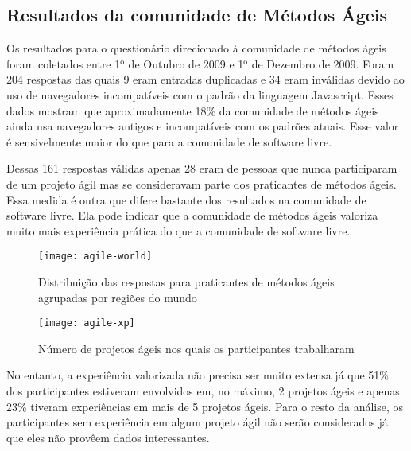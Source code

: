 \subsection{Resultados da comunidade de Métodos Ágeis}
\label{sec:resp-agile}

Os resultados para o questionário direcionado à comunidade de métodos
ágeis foram coletados entre 1$^{\textrm{o}}$ de Outubro de 2009 e
1$^{\textrm{o}}$ de Dezembro de 2009. Foram 204 respostas das quais 9
eram entradas duplicadas e 34 eram inválidas devido ao uso de
navegadores incompatíveis com o padrão da linguagem Javascript. Esses
dados mostram que aproximadamente 18\% da comunidade de métodos ágeis
ainda usa navegadores antigos e incompatíveis com os padrões
atuais. Esse valor é sensivelmente maior do que para a comunidade de
software livre.

Dessas 161 respostas válidas apenas 28 eram de pessoas que nunca
participaram de um projeto ágil mas se consideravam parte dos
praticantes de métodos ágeis. Essa medida é outra que difere bastante
dos resultados na comunidade de software livre. Ela pode indicar que a
comunidade de métodos ágeis valoriza muito mais experiência prática do
que a comunidade de software livre.


\begin{figure}[htb]
  \begin{minipage}[t]{0.45\linewidth}
    \centering
    \texttt{[image: agile-world]}
    \caption{Distribuição das respostas para praticantes de métodos
      ágeis agrupadas por regiões do mundo}
    \label{fig:agile-world}
  \end{minipage}
  \begin{minipage}[t]{0.55\linewidth}
    \centering
    \texttt{[image: agile-xp]}
    \caption{Número de projetos ágeis nos quais os participantes
      trabalharam}
    \label{fig:agile-xp}
  \end{minipage}
\end{figure}

No entanto, a experiência valorizada não precisa ser muito extensa já
que 51\% dos participantes estiveram envolvidos em, no máximo, 2
projetos ágeis e apenas 23\% tiveram experiências em mais de 5
projetos ágeis.  Para o resto da análise, os participantes sem
experiência em algum projeto ágil não serão considerados já que eles
não provêem dados interessantes.


